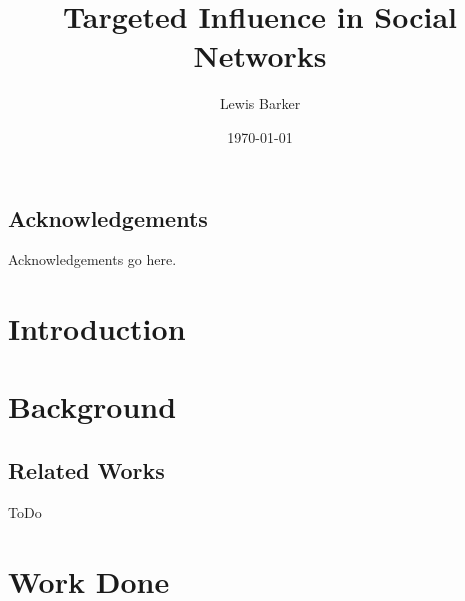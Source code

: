 \documentclass[bsc,frontabs,twoside,singlespacing,parskip,deptreport]{infthesis}     %
\begin{document}
\title{Targeted Influence in Social Networks}

\author{Lewis Barker}



\date{\today}


\maketitle

\section*{Acknowledgements}
Acknowledgements go here. 

\tableofcontents



\chapter{Introduction}


\chapter{Background}
\section{Related Works}
ToDo

\chapter{Work Done}
\end{document}
